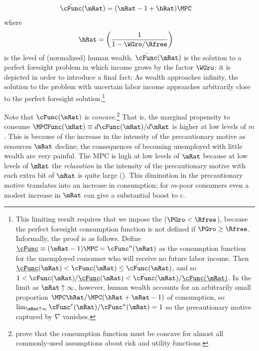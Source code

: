 \documentclass{\handout}
\begin{document}
\begin{equation}\begin{gathered}\begin{aligned}
  \bar{\cFunc}(\mRat) & =  (\mRat-1+\hRat)\MPCU
\end{aligned}\end{gathered}\end{equation}
where
\begin{equation}\begin{gathered}\begin{aligned}
  \hRat & =  \left(\frac{1}{1-\WGro/\Rfree}\right)
\end{aligned}\end{gathered}\end{equation}
is the level of (normalized) human wealth.  $\bar{\cFunc}(\mRat)$ is the
solution to a perfect foresight problem in which income 
grows by the factor $\WGro$; it is depicted in order to
introduce a final fact: As wealth approaches infinity, the solution
to the problem with uncertain labor income approaches arbitrarily
close to the perfect foresight solution.\footnote{This
  limiting result requires that we impose the \FHWCPGro ($\PGro < \Rfree$), because the perfect foresight consumption function is
  not defined if $\PGro \geq \Rfree$.  Informally, the proof is as follows.  Define $\underbar{\cFunc}\equiv (\mRat-1)\MPCU=\cFunc^{u}(\mRat)$ as the consumption function for the unemployed consumer who will receive no future labor income.  Then$\underbar{\cFunc}(\mRat) < \cFunc(\mRat) \leq \bar{\cFunc}(\mRat)$, and so $1 < \cFunc(\mRat)/\underbar{\cFunc}(\mRat)<\bar{\cFunc}(\mRat)/\underbar{\cFunc(\mRat)}$. In the limit as $\mRat \uparrow \infty$, however, human wealth accounts for an arbitrarily small proportion $\MPCU \hRat/\MPCU (\hRat+\mRat-1)$ of consumption, so $\lim_{\mRat \uparrow \infty} \cFunc^{e}(\mRat)/\cFunc^{u}(\mRat) = 1$ so the precautionary motive captured by $\nabla$ vanishes.}

Note that $\cFunc(\mRat)$ is {\it concave}.\footnote{\cite{carroll&kimball:concavity} prove that the consumption
function must be concave for almost all commonly-used assumptions about
risk and utility functions.} That is, the marginal propensity to
consume $\MPCFunc(\mRat) \equiv d \cFunc(\mRat)/d \mRat$ is higher at low levels of $m$.  This is because
of the increase in the intensity of the precautionary motive as resources
$\mRat$ decline; the consequences of becoming unemployed with little wealth are very painful.  The MPC is high at low
levels of $\mRat$ because at low levels of $\mRat$ the {\it relaxation} in the
intensity of the precautionary motive with each extra bit of $\mRat$ is quite large (\cite{kimball:smallandlarge}).
This diminution in the precautionary motive translates into an increase
in consumption; for $m$-poor consumers even a modest increase in $\mRat$ can
give a substantial boost to $c$.
\end{document}
